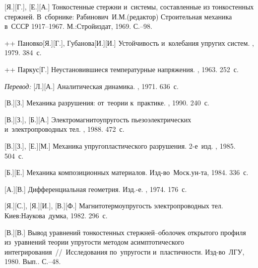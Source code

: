 \begin{thebibliography}{123}
\begin{otherlanguage}{russian}
[Я.][Г.], [Е.][А.] Тонкостенные стержни и~системы, составленные из тонкостенных стержней. В~сборнике: Рабинович~И.\:М.\:(редактор) Строительная механика в~СССР 1917\hbox{--}1967. М.:\;Строй\-издат, 1969. С.\hbox{--}98.

++ {Пановко}[Я.][Г.], {Губанова}[И.][И.] Устойчивость и~колебания упругих систем. \naukapublisher, 1979. 384~с.

++ {Паркус}[Г.] Неустановившиеся температурные напряжения. \fizmatgiz, 1963. 252~с.


\emph{Перевод:} [Л.][А.] Аналитическая динамика. \naukapublisher, 1971. 636~с.

[В.][З.] Механика разрушения: от~теории к~практике. \naukapublisher, 1990. 240~с.

[В.][З.], [Б.][А.] Электромагнитоупругость пьезоэлектрических и~электропроводных тел. \naukapublisher, 1988. 472~с.

[В.][З.], [Е.][М.] Механика упругопластического разрушения. 2\hbox{-}е~изд. \naukapublisher, 1985. 504~с.

[Б.][Е.] Механика композиционных материалов. Изд\hbox{-}во~Моск.\:ун\hbox{-}та, 1984. 336~с.

[А.][В.] Дифференциальная геометрия. Изд.\hbox{-}е. \naukapublisher, 1974. 176~с.

[Я.][С.], [Я.][И.], [В.][Ф.] Магнито\-термо\-упру\-гость электропроводных тел. Киев:\;Наукова~думка, 1982. 296~с.

[В.][В.] Вывод уравнений тонко\-стен\-ных стержней\hbox{--}обо\-ло\-чек открытого профиля из~уравнений теории упругости методом асимптотического интегрирования~//~Исследования по~упругости и~пластичности. Изд\hbox{-}во~ЛГУ, 1980. Вып.. С.\hbox{--}48.


\end{otherlanguage}
\end{thebibliography}
